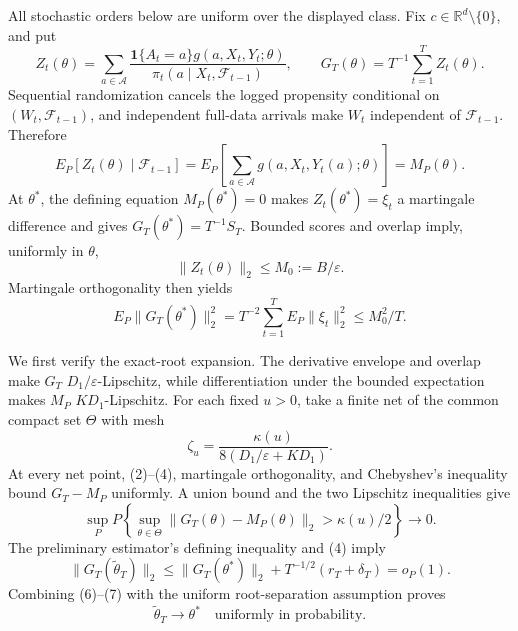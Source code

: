 All stochastic orders below are uniform over the displayed class. Fix \(c\in\mathbb R^d\setminus\{0\}\), and put
\[
 Z_t(\theta)=\sum_{a\in\mathcal A}
 \frac{\mathbf1\{A_t=a\}g(a,X_t,Y_t;\theta)}
 {\pi_t(a\mid X_t,\mathcal F_{t-1})},
 \qquad G_T(\theta)=T^{-1}\sum_{t=1}^TZ_t(\theta).
\tag{1}
\]
Sequential randomization cancels the logged propensity conditional on \((W_t,\mathcal F_{t-1})\), and independent full-data arrivals make \(W_t\) independent of \(\mathcal F_{t-1}\). Therefore
\[
 E_P[Z_t(\theta)\mid\mathcal F_{t-1}]
 =E_P\!\left[\sum_{a\in\mathcal A}g(a,X_t,Y_t(a);\theta)\right]
 =M_P(\theta).
\tag{2}
\]
At \(\theta^*\), the defining equation \(M_P(\theta^*)=0\) makes \(Z_t(\theta^*)=\xi_t\) a martingale difference and gives \(G_T(\theta^*)=T^{-1}S_T\). Bounded scores and overlap imply, uniformly in \(\theta\),
\[
 \|Z_t(\theta)\|_2\le M_0:=B/\varepsilon.
\tag{3}
\]
Martingale orthogonality then yields
\[
 E_P\|G_T(\theta^*)\|_2^2
 =T^{-2}\sum_{t=1}^TE_P\|\xi_t\|_2^2
 \le M_0^2/T.
\tag{4}
\]

We first verify the exact-root expansion. The derivative envelope and overlap make \(G_T\) \(D_1/\varepsilon\)-Lipschitz, while differentiation under the bounded expectation makes \(M_P\) \(KD_1\)-Lipschitz. For each fixed \(u>0\), take a finite net of the common compact set \(\Theta\) with mesh
\[
 \zeta_u=\frac{\kappa(u)}{8(D_1/\varepsilon+KD_1)}.
\tag{5}
\]
At every net point, (2)--(4), martingale orthogonality, and Chebyshev's inequality bound \(G_T-M_P\) uniformly. A union bound and the two Lipschitz inequalities give
\[
 \sup_P P\!\left\{\sup_{\theta\in\Theta}
 \|G_T(\theta)-M_P(\theta)\|_2>\kappa(u)/2\right\}\longrightarrow0.
\tag{6}
\]
The preliminary estimator's defining inequality and (4) imply
\[
 \|G_T(\widetilde\theta_T)\|_2
 \le\|G_T(\theta^*)\|_2+T^{-1/2}(r_T+\delta_T)=o_P(1).
\tag{7}
\]
Combining (6)--(7) with the uniform root-separation assumption proves
\[
 \widetilde\theta_T\longrightarrow\theta^*
 \quad\text{uniformly in probability}.
\tag{8}
\]

